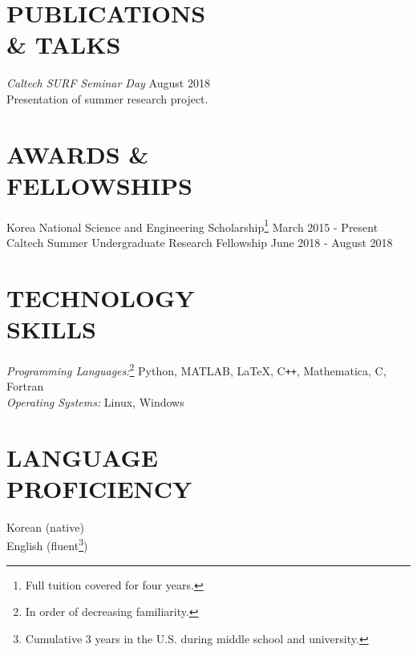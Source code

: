 \documentclass[margin, 10pt]{res} %
\begin{document}
\begin{resume}
\section{PUBLICATIONS \\ \& TALKS}

{\sl Caltech SURF Seminar Day} \hfill{August 2018}\\
Presentation of summer research project.


\section{AWARDS \& \\ FELLOWSHIPS}

Korea National Science and Engineering Scholarship\footnote{Full tuition covered for four years.} \hfill March 2015 - Present\\
Caltech Summer Undergraduate Research Fellowship \hfill June 2018 - August 2018\\




\section{TECHNOLOGY \\ SKILLS} 

{\sl Programming Languages:}\footnote{In order of decreasing familiarity.} Python, MATLAB, \LaTeX, C\texttt{++}, Mathematica, C, Fortran  \\
{\sl Operating Systems:} Linux, Windows \\
 
\section{LANGUAGE \\ PROFICIENCY} 

Korean (native) \\
English (fluent\footnote{Cumulative 3 years in the U.S. during middle school and university.}) \\
 


\end{resume}
\end{document}
